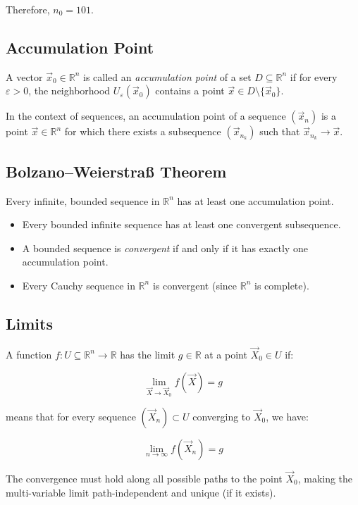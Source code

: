 Therefore, \(n_0 = 101\).

\subsection{Accumulation Point}

A vector \( \vec{x}_0 \in \mathbb{R}^n \) is called an \emph{accumulation point} of a set \( D \subseteq \mathbb{R}^n \) if for every \( \varepsilon > 0 \), the neighborhood \( U_\varepsilon(\vec{x}_0) \) contains a point \( \vec{x} \in D \setminus \{\vec{x}_0\} \).

In the context of sequences, an accumulation point of a sequence \( (\vec{x}_n) \) is a point \( \vec{x} \in \mathbb{R}^n \) for which there exists a subsequence \( (\vec{x}_{n_k}) \) such that \( \vec{x}_{n_k} \to \vec{x} \).

\subsection{Bolzano–Weierstraß Theorem}

Every infinite, bounded sequence in \( \mathbb{R}^n \) has at least one accumulation point.

\begin{itemize}[label=\(-\)]
\item Every bounded infinite sequence has at least one convergent subsequence.
\item A bounded sequence is \emph{convergent} if and only if it has exactly one accumulation point.
\item Every Cauchy sequence in \( \mathbb{R}^n \) is convergent (since \( \mathbb{R}^n \) is complete).
\end{itemize}

\subsection{Limits}

A function \( f : U \subseteq \mathbb{R}^n \to \mathbb{R} \) has the limit \( g \in \mathbb{R} \) at a point \( \vec{X}_0 \in U \) if:

\[
\lim_{\vec{X} \to \vec{X}_0} f(\vec{X}) = g
\]

means that for every sequence \( (\vec{X}_n) \subset U \) converging to \( \vec{X}_0 \), we have:

\[
\lim_{n \to \infty} f(\vec{X}_n) = g
\]

The convergence must hold along all possible paths to the point \( \vec{X}_0 \), making the multi-variable limit path-independent and unique (if it exists).
\vspace{\baselineskip}

